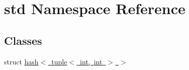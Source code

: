 \hypertarget{namespacestd}{}\section{std Namespace Reference}
\label{namespacestd}
\subsection*{Classes}
\begin{DoxyCompactItemize}
\item 
struct \mbox{\hyperlink{structstd_1_1hash_3_01tuple_3_01int_00_01int_01_4_01_4}{hash$<$ tuple$<$ int, int $>$ $>$}}
\end{DoxyCompactItemize}
